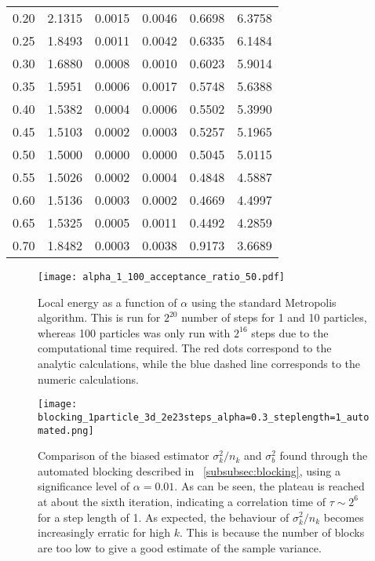 \documentclass[
    a4paper, aps, twocolumn, floatfix, superscriptaddress,
    nofootinbib]{revtex4-1}
\begin{document}
\begin{table}[h!]
\begin{ruledtabular}
\begin{tabular}{cccccc}
0.20     & 2.1315 & 0.0015   & 0.0046     & 0.6698      & 6.3758    \\
0.25     & 1.8493 & 0.0011   & 0.0042     & 0.6335      & 6.1484    \\
0.30     & 1.6880 & 0.0008   & 0.0010     & 0.6023      & 5.9014    \\
0.35     & 1.5951 & 0.0006   & 0.0017     & 0.5748      & 5.6388    \\
0.40     &  1.5382 & 0.0004   & 0.0006     & 0.5502      & 5.3990    \\
0.45     & 1.5103 & 0.0002   & 0.0003     & 0.5257      & 5.1965    \\
0.50     &  1.5000 & 0.0000   & 0.0000     & 0.5045      & 5.0115    \\
0.55     &  1.5026 & 0.0002   & 0.0004     & 0.4848      & 4.5887    \\
0.60     & 1.5136 & 0.0003   & 0.0002     & 0.4669      & 4.4997    \\
0.65     &  1.5325 & 0.0005   & 0.0011     & 0.4492      & 4.2859   \\
0.70     & 1.8482 & 0.0003   & 0.0038     & 0.9173      & 3.6689   \\
\end{tabular}
\end{ruledtabular}
\end{table}

\begin{figure}[h!]
    \centering
    \texttt{[image: alpha\_1\_100\_acceptance\_ratio\_50.pdf]}
    \caption{Local energy as a function of $\alpha$ using the standard Metropolis algorithm. This is run for $2^{20}$ number of steps for 1 and 10 particles, whereas 100 particles was only run with $2^{16}$ steps due to the computational time required. The red dots correspond to the analytic calculations, while the blue dashed line corresponds to the numeric calculations.}
    \label{fig:brute_force_spherical_localE}
\end{figure}

\begin{figure}[H]
    \centering
    \texttt{[image: blocking\_1particle\_3d\_2e23steps\_alpha=0.3\_steplength=1\_automated.png]}
    \caption{Comparison of the biased estimator $\sigma_k^2/n_k$ and $\sigma_b^2$ found through the automated blocking described in ~\ref{subsubsec:blocking}, using a significance level of $\alpha = 0.01$. As can be seen, the plateau is reached at about the sixth iteration, indicating a correlation time of $\tau \sim 2^6$  for a step length of 1. As expected, the behaviour of $\sigma_k^2/n_k$ becomes increasingly erratic for high $k$. This is because the number of blocks are too low to give a good estimate of the sample variance.}
    \label{fig:blocking_behaviour}
\end{figure}
\end{document}
